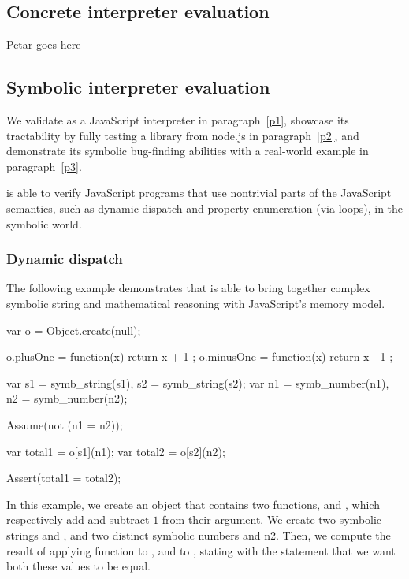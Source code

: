
\subsection{Concrete interpreter evaluation}

Petar goes here

\subsection{Symbolic interpreter evaluation}

We validate \cosette as a JavaScript interpreter in paragraph~\ref{p1}, showcase its tractability by fully testing a library from node.js in paragraph~\ref{p2}, and demonstrate its symbolic bug-finding abilities with a real-world example in paragraph~\ref{p3}.


\cosette is able to verify JavaScript programs that use nontrivial parts of the JavaScript semantics, such as dynamic dispatch and property enumeration (via  loops), in the symbolic world.

\subsubsection{Dynamic dispatch}
The following example demonstrates that \cosette is able to bring together complex symbolic string and mathematical reasoning with JavaScript's memory model.

\begin{lstjs}
var o = Object.create(null);

o.plusOne = function(x) { return x + 1 };
o.minusOne = function(x) { return x - 1 };

var s1 = symb_string(s1), s2 = symb_string(s2);
var n1 = symb_number(n1), n2 = symb_number(n2);

Assume(not (n1 = n2));

var total1 = o[s1](n1);
var total2 = o[s2](n2);

Assert(total1 = total2);
\end{lstjs}

In this example, we create an object  that contains two functions,  and , which respectively add and subtract $1$ from their argument.
We create two symbolic strings  and , and two distinct symbolic numbers  and {n2}.
Then, we compute the result of applying function  to , and  to , stating with the  statement that we want both these values to be equal.

